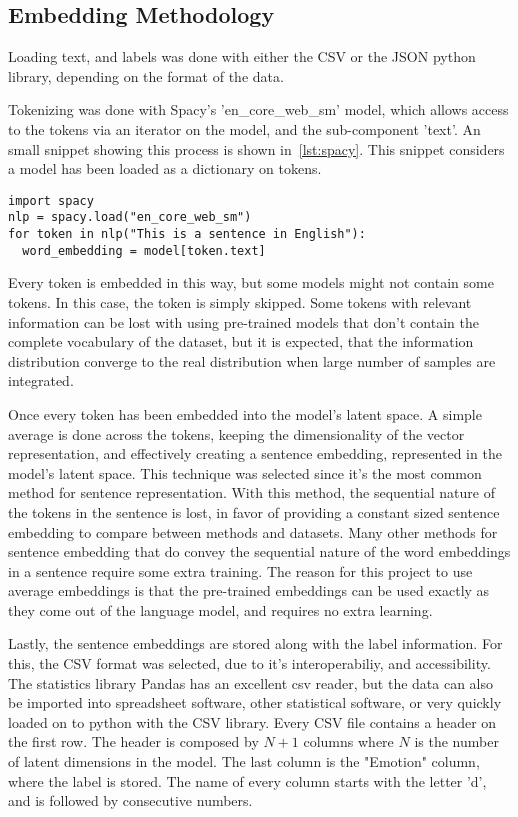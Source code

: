 \subsection{Embedding Methodology}\label{sub:Embedding Methodology}

Loading text, and labels was done with either the CSV or the JSON python library, depending on the format of the data.

Tokenizing was done with Spacy's 'en_core_web_sm' model, which allows access to the tokens via an iterator on the model, and the sub-component 'text'. An small snippet showing this process is shown in~\ref{lst:spacy}. This snippet considers a model has been loaded as a dictionary on tokens.

\begin{lstlisting}[caption={Tokenizing with Spacy},label=lst:spacy,frame=single]
import spacy
nlp = spacy.load("en_core_web_sm")
for token in nlp("This is a sentence in English"):
  word_embedding = model[token.text]
\end{lstlisting}

Every token is embedded in this way, but some models might not contain some tokens. In this case, the token is simply skipped. Some tokens with relevant information can be lost with using pre-trained models that don't contain the complete vocabulary of the dataset, but it is expected, that the information distribution converge to the real distribution when large number of samples are integrated.

Once every token has been embedded into the model's latent space. A simple average is done across the tokens, keeping the dimensionality of the vector representation, and effectively creating a sentence embedding, represented in the model's latent space. This technique was selected since it's the most common method for sentence representation. With this method, the sequential nature of the tokens in the sentence is lost, in favor of providing a constant sized sentence embedding to compare between methods and datasets. Many other methods for sentence embedding that do convey the sequential nature of the word embeddings in a sentence require some extra training. The reason for this project to use average embeddings is that the pre-trained embeddings can be used exactly as they come out of the language model, and requires no extra learning.

Lastly, the sentence embeddings are stored along with the label information. For this, the CSV format was selected, due to it's interoperabiliy, and accessibility. The statistics library Pandas has an excellent csv reader, but the data can also be imported into spreadsheet software, other statistical software, or very quickly loaded on to python with the CSV library. Every CSV file contains a header on the first row. The header is composed by $N+1$ columns where $N$ is the number of latent dimensions in the model. The last column is the "Emotion" column, where the label is stored. The name of every column starts with the letter 'd', and is followed by consecutive numbers.

